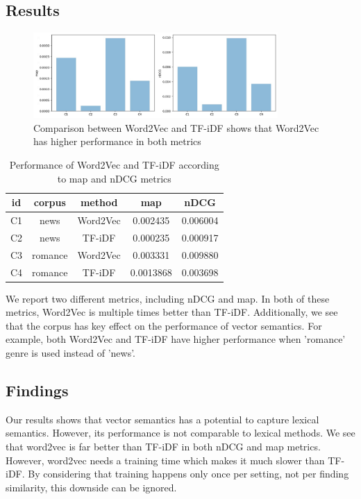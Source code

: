 \documentclass[sigconf]{acmart}
\begin{document}
\subsection{Results}
\begin{figure}[!htb]
\centerline{\includegraphics[width=22pc]{combined_horizontal.jpg}}
\caption{Comparison between Word2Vec and TF-iDF shows that Word2Vec has higher performance in both metrics}
\label{fig:ndcg}
\end{figure}
\begin{table}[!htb]
\begin{tabular}{ |c|c|c|c|c| } 
\hline
id & corpus & method & map & nDCG\\
\hline
C1 & news & Word2Vec & 0.002435 & 0.006004\\ 
C2 & news & TF-iDF & 0.000235 & 0.000917\\
C3 & romance & Word2Vec & 0.003331 & 0.009880\\
C4 & romance & TF-iDF & 0.0013868 & 0.003698\\
\hline
\end{tabular}
\caption{\label{tab:map-table}Performance of Word2Vec and TF-iDF according to map and nDCG metrics}
\end{table}
We report two different metrics, including nDCG and map. In both of these metrics, Word2Vec is multiple times better than TF-iDF. Additionally, we see that the corpus has key effect on the performance of vector semantics. For example, both Word2Vec and TF-iDF have higher performance when 'romance' genre is used instead of 'news'. 
\subsection{Findings}
Our results shows that vector semantics has a potential to capture lexical semantics. However, its performance is not comparable to lexical methods.
We see that word2vec is far better than TF-iDF in both nDCG and map metrics. However, word2vec needs a training time which makes it much slower than TF-iDF. By considering that training happens only once per setting, not per finding similarity, this downside can be ignored.


 
\end{document}
